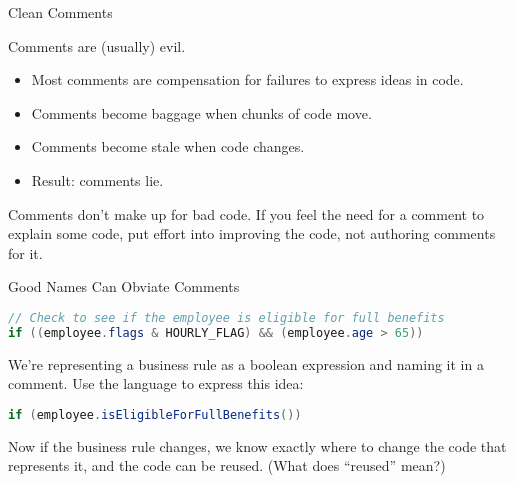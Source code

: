 \documentclass{beamer}
\begin{document}
\begin{frame}[fragile]{Clean Comments}


Comments are (usually) evil.
\begin{itemize}
\item Most comments are compensation for failures to express ideas in code.
\item Comments become baggage when chunks of code move.
\item Comments become stale when code changes.
\item Result: comments lie.
\end{itemize}

Comments don't make up for bad code.  If you feel the need for a comment to explain some code, put effort into improving the code, not authoring comments for it.


\end{frame}

\begin{frame}[fragile]{Good Names Can Obviate Comments}


\begin{lstlisting}[language=Java]
// Check to see if the employee is eligible for full benefits
if ((employee.flags & HOURLY_FLAG) && (employee.age > 65))
\end{lstlisting}
We're representing a business rule as a boolean expression and naming it in a comment.  Use the language to express this idea:
\begin{lstlisting}[language=Java]
if (employee.isEligibleForFullBenefits())
\end{lstlisting}
Now if the business rule changes, we know exactly where to change the code that represents it, and the code can be reused.  (What does ``reused'' mean?)\\


\end{frame}
\end{document}
